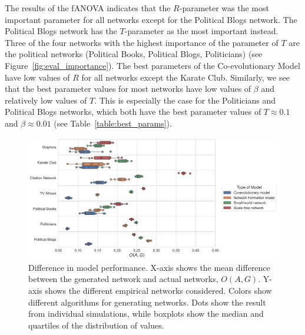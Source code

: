 \documentclass[11pt]{article}
\begin{document}
\noindent The results of the fANOVA indicates that the $R$-parameter was the most important parameter for all networks except for the Political Blogs network. The Political Blogs network has the $T$-parameter as the most important instead. Three of the four networks with the highest importance of the parameter of $T$ are the political networks (Political Books, Political Blogs, Politicians) (see Figure~\ref{fig:eval_importance}).
The best parameters of the Co-evolutionary Model have low values of $R$ for all networks except the Karate Club. Similarly, we see that the best parameter values for most networks have low values of $\beta$ and relatively low values of $T$. This is especially the case for the Politicians and Political Blogs networks, which both have the best parameter values of $T \approx 0.1$ and $\beta \approx 0.01$ (see Table~\ref{table:best_params}).  

\begin{figure}[H]
    \centering
    \includegraphics[width=.9\linewidth]{../plots/overall/Model_Evaluation.png}
  \caption{Difference in model performance. X-axis shows the mean difference between the generated network and actual networks, $O(A, G)$. Y-axis shows the different empirical networks considered. Colors show different algorithms for generating networks. Dots show the result from individual simulations, while boxplots show the median and quartiles of the distribution of values.}
  \label{fig:eval_mean}
\end{figure}
\end{document}
